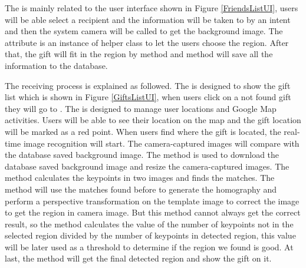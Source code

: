 \par The  is mainly related to the user interface shown in Figure \ref{FriendsListUI}, users will be able select a recipient and the information will be taken to  by an intent and then the system camera will be called to get the background image. The  attribute is an instance of helper class  to let the users choose the region. After that, the gift will fit in the region by  method and  method will save all the information to the database.
\par The receiving process is explained as followed. The  is designed to show the gift list which is shown in Figure \ref{GiftsListUI}, when users click on a not found gift they will go to . The  is designed to manage user locations and Google Map activities. Users will be able to see their location on the map and the gift location will be marked as a red point. When users find where the gift is located, the real-time image recognition will start. The camera-captured images will compare with the database saved background image. The  method is used to download the database saved background image and resize the camera-captured images. The  method calculates the keypoints in two images and finds the matches. The  method will use the matches found before to generate the homography and perform a perspective transformation on the template image to correct the image to get the region in camera image. But this method cannot always get the correct result, so the  method calculates the value of the number of keypoints not in the selected region divided by the number of keypoints in detected region, this value will be later used as a threshold to determine if the region we found is good. At last, the  method will get the final detected region and show the gift on it.

